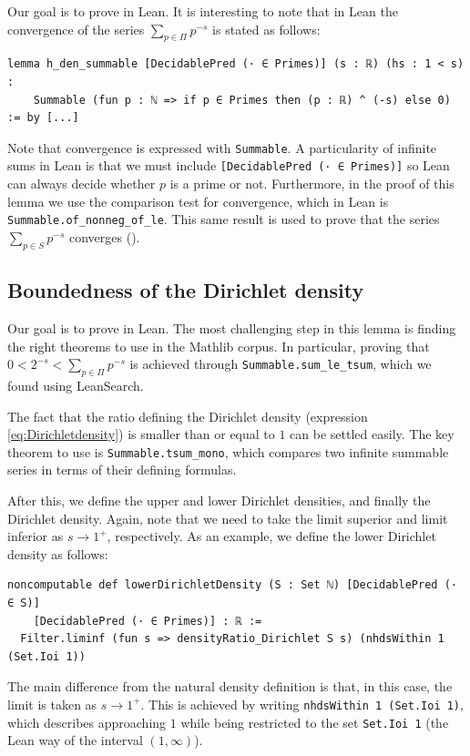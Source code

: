 \documentclass[a4paper,11pt]{article}
\theoremstyle{plain}
\begin{document}
    Our goal is to prove  in Lean. It is interesting to note that in Lean the convergence of the series $\sum_{p\in\Pi}p^{-s}$ is stated as follows:\\
    \begin{lstlisting}[caption={Statement that $\sum_{p\in\Pi}p^{-s}$ converges.}, label={list:7}]
    lemma h_den_summable [DecidablePred (· ∈ Primes)] (s : ℝ) (hs : 1 < s) :
    Summable (fun p : ℕ => if p ∈ Primes then (p : ℝ) ^ (-s) else 0) := by [...]
	\end{lstlisting}
    Note that convergence is expressed with \lstinline|Summable|. A particularity of infinite sums in Lean is that we must include \lstinline|[DecidablePred (· ∈ Primes)]| so Lean can always decide whether $p$ is a prime or not. Furthermore, in the proof of this lemma we use the comparison test for convergence, which in Lean is \lstinline|Summable.of_nonneg_of_le|. This same result is used to prove that the series $\sum_{p\in S}p^{-s}$ converges ().

    \subsection{Boundedness of the Dirichlet density}

    Our goal is to prove  in Lean. The most challenging step in this lemma is finding the right theorems to use in the Mathlib corpus. In particular, proving that $0<2^{-s}<\sum_{p\in \Pi}p^{-s}$ is achieved through \lstinline|Summable.sum_le_tsum|, which we found using LeanSearch.

    The fact that the ratio defining the Dirichlet density (expression \eqref{eq:Dirichletdensity}) is smaller than or equal to $1$ can be settled easily. The key theorem to use is \lstinline|Summable.tsum_mono|, which compares two infinite summable series in terms of their defining formulas.

    After this, we define the upper and lower Dirichlet densities, and finally the Dirichlet density. Again, note that we need to take the limit superior and limit inferior as $s\rightarrow 1^+$, respectively. As an example, we define the lower Dirichlet density as follows:\\
    \begin{lstlisting}[caption={Definition of the lower Dirichlet density.}, label={list:8}]
	noncomputable def lowerDirichletDensity (S : Set ℕ) [DecidablePred (· ∈ S)]
    [DecidablePred (· ∈ Primes)] : ℝ :=
  Filter.liminf (fun s => densityRatio_Dirichlet S s) (nhdsWithin 1 (Set.Ioi 1))
	\end{lstlisting}
    The main difference from the natural density definition is that, in this case, the limit is taken as $s\rightarrow 1^+$. This is achieved by writing \lstinline|nhdsWithin 1 (Set.Ioi 1)|, which describes approaching $1$ while being restricted to the set \lstinline|Set.Ioi 1| (the Lean way of the interval $(1,\infty)$).
\end{document}
